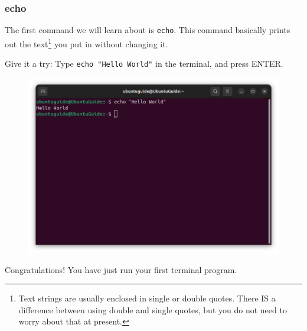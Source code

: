 \documentclass[12pt]{article}
\begin{document}
 \pagebreak
\subsubsection{echo}

The first command we will learn about is \verb|echo|. This command basically prints out the text\footnote{Text strings are usually enclosed in single or double quotes. There IS a difference between using double and single quotes, but you do not need to worry about that at present.} you put in without changing it.

Give it a try: Type \verb|echo "Hello World"| in the terminal, and press ENTER.

\begin{figure}[htp]
    \centering
    \includegraphics[width=\textwidth]{2-6.png}
\end{figure}

Congratulations! You have just run your first terminal program. 
\end{document}
